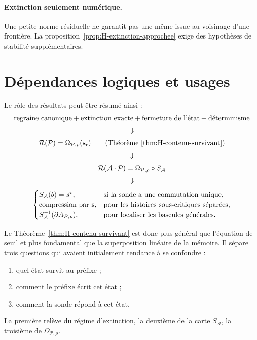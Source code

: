 \paragraph{Extinction seulement numérique.}
Une petite norme résiduelle ne garantit pas une même issue au voisinage
d'une frontière. La proposition~\ref{prop:H-extinction-approchee} exige des hypothèses de
stabilité supplémentaires.

\section{Dépendances logiques et usages}
\label{annexe-H-dependances}

Le rôle des résultats peut être résumé ainsi :
\[
\begin{array}{c}
\text{regraine canonique}
+
\text{extinction exacte}
+
\text{fermeture de l'état}
+
\text{déterminisme}
\\[2mm]
\Downarrow
\\[2mm]
\mathcal R(\mathcal P)=\Omega_{\mathcal P,\rho}(\mathbf s_{\mathrm r})
\qquad\text{(Théorème~\ref{thm:H-contenu-survivant})}
\\[2mm]
\Downarrow
\\[2mm]
\mathcal R(\mathcal A\cdot\mathcal P)
=
\Omega_{\mathcal P,\rho}\circ S_{\mathcal A}
\\[2mm]
\Downarrow
\\[2mm]
\begin{cases}
S_{\mathcal A}(b)=s^{\star},
&\text{si la sonde a une commutation unique},\\
\text{compression par }\mathbf s,
&\text{pour les histoires sous-critiques séparées},\\
S_{\mathcal A}^{-1}(\partial A_{\mathcal P,\rho}),
&\text{pour localiser les bascules générales}.
\end{cases}
\end{array}
\]

Le Théorème~\ref{thm:H-contenu-survivant} est donc plus général que l'équation de seuil et plus
fondamental que la superposition linéaire de la mémoire. Il sépare trois
questions qui avaient initialement tendance à se confondre :
\begin{enumerate}
\item quel état survit au préfixe ;
\item comment le préfixe écrit cet état ;
\item comment la sonde répond à cet état.
\end{enumerate}
La première relève du régime d'extinction, la deuxième de la carte
$S_{\mathcal A}$, la troisième de
$\Omega_{\mathcal P,\rho}$.

